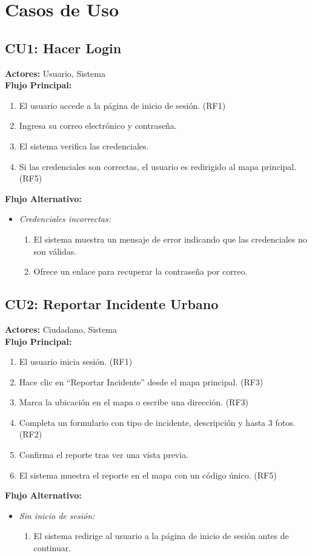 \section{Casos de Uso}

\subsection*{CU1: Hacer Login}
\textbf{Actores:} Usuario, Sistema\\
\textbf{Flujo Principal:}
\begin{enumerate}
    \item El usuario accede a la página de inicio de sesión. (RF1)
    \item Ingresa su correo electrónico y contraseña.
    \item El sistema verifica las credenciales.
    \item Si las credenciales son correctas, el usuario es redirigido al mapa principal. (RF5)
\end{enumerate}
\textbf{Flujo Alternativo:}
\begin{itemize}
    \item \textit{Credenciales incorrectas:}
    \begin{enumerate}
        \item El sistema muestra un mensaje de error indicando que las credenciales no son válidas.
        \item Ofrece un enlace para recuperar la contraseña por correo.
    \end{enumerate}
\end{itemize}


\subsection*{CU2: Reportar Incidente Urbano}
\textbf{Actores:} Ciudadano, Sistema\\
\textbf{Flujo Principal:}
\begin{enumerate}
    \item El usuario inicia sesión. (RF1)
    \item Hace clic en ``Reportar Incidente'' desde el mapa principal. (RF3)
    \item Marca la ubicación en el mapa o escribe una dirección. (RF3)
    \item Completa un formulario con tipo de incidente, descripción y hasta 3 fotos. (RF2)
    \item Confirma el reporte tras ver una vista previa.
    \item El sistema muestra el reporte en el mapa con un código único. (RF5)
\end{enumerate}
\textbf{Flujo Alternativo:}
\begin{itemize}
    \item \textit{Sin inicio de sesión:}
    \begin{enumerate}
        \item El sistema redirige al usuario a la página de inicio de sesión antes de continuar.
    \end{enumerate}
\end{itemize}

